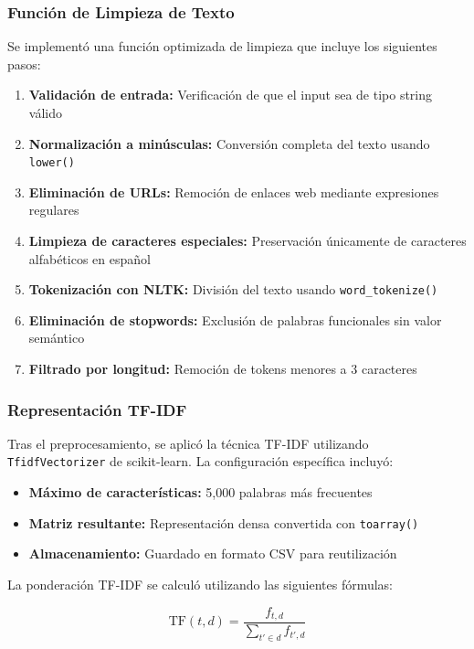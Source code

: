\subsubsection{Función de Limpieza de Texto}

Se implementó una función optimizada de limpieza que incluye los siguientes pasos:

\begin{enumerate}
    \item \textbf{Validación de entrada:} Verificación de que el input sea de tipo string válido
    \item \textbf{Normalización a minúsculas:} Conversión completa del texto usando \texttt{lower()}
    \item \textbf{Eliminación de URLs:} Remoción de enlaces web mediante expresiones regulares
    \item \textbf{Limpieza de caracteres especiales:} Preservación únicamente de caracteres alfabéticos en español
    \item \textbf{Tokenización con NLTK:} División del texto usando \texttt{word\_tokenize()}
    \item \textbf{Eliminación de stopwords:} Exclusión de palabras funcionales sin valor semántico
    \item \textbf{Filtrado por longitud:} Remoción de tokens menores a 3 caracteres
\end{enumerate}

\subsubsection{Representación TF-IDF}

Tras el preprocesamiento, se aplicó la técnica TF-IDF utilizando \texttt{TfidfVectorizer} de scikit-learn. La configuración específica incluyó:

\begin{itemize}
    \item \textbf{Máximo de características:} 5,000 palabras más frecuentes
    \item \textbf{Matriz resultante:} Representación densa convertida con \texttt{toarray()}
    \item \textbf{Almacenamiento:} Guardado en formato CSV para reutilización
\end{itemize}

La ponderación TF-IDF se calculó utilizando las siguientes fórmulas:

\begin{equation}
\text{TF}(t,d) = \frac{f_{t,d}}{\sum_{t' \in d} f_{t',d}}
\end{equation}

